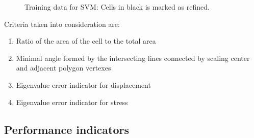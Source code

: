 \begin{figure}[!ht]
\begin{subfigure}[b]{0.49\linewidth}
{        }
    \end{subfigure}
    \begin{subfigure}[b]{0.49\linewidth}
    \end{subfigure}
    \caption[Training data for SVM]{Training data for SVM: Cells in black is marked as refined.}
    \label{adap_fig:svm_train_my}
\end{figure}

Criteria taken into consideration are: 
\begin{enumerate}
    \item Ratio of the area of the cell to the total area
    \item Minimal angle formed by the intersecting lines connected by scaling center and adjacent polygon vertexes
    \item Eigenvalue error indicator for displacement
    \item Eigenvalue error indicator for stress
\end{enumerate}

\subsection{Performance indicators}
